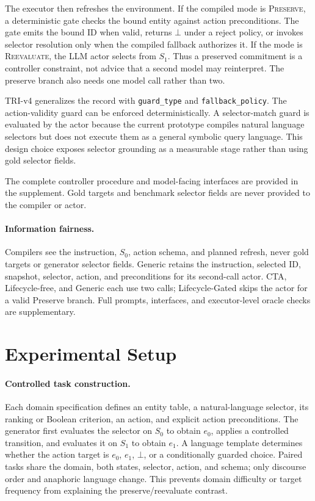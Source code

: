 \documentclass[letterpaper]{article}
\begin{document}
The executor then refreshes the environment. If the compiled mode is \textsc{Preserve}, a
deterministic gate checks the bound entity against action preconditions. The gate emits the
bound ID when valid, returns $\bot$ under a reject policy, or invokes selector resolution only
when the compiled fallback authorizes it. If the mode is \textsc{Reevaluate}, the LLM actor
selects from $S_1$. Thus a preserved commitment is a controller constraint, not advice that a
second model may reinterpret. The preserve branch also needs one model call rather than two.

TRI-v4 generalizes the record with \texttt{guard\_type} and
\texttt{fallback\_policy}. The action-validity guard can be enforced deterministically. A
selector-match guard is evaluated by the actor because the current prototype compiles natural
language selectors but does not execute them as a general symbolic query language. This design
choice exposes selector grounding as a measurable stage rather than using gold selector fields.

The complete controller procedure and model-facing interfaces are provided in the supplement.
Gold targets and benchmark selector fields are never provided to the compiler or actor.

\paragraph{Information fairness.}
Compilers see the instruction, $S_0$, action schema, and planned refresh, never gold targets or
generator selector fields. Generic retains the instruction, selected ID, snapshot, selector,
action, and preconditions for its second-call actor. CTA, Lifecycle-free, and Generic each use
two calls; Lifecycle-Gated skips the actor for a valid Preserve branch. Full prompts, interfaces,
and executor-level oracle checks are supplementary.

\section{Experimental Setup}

\paragraph{Controlled task construction.}
Each domain specification defines an entity table, a natural-language selector, its ranking or
Boolean criterion, an action, and explicit action preconditions. The generator first evaluates
the selector on $S_0$ to obtain $e_0$, applies a controlled transition, and evaluates it on
$S_1$ to obtain $e_1$. A language template determines whether the action target is $e_0$,
$e_1$, $\bot$, or a conditionally guarded choice. Paired tasks share the domain, both states,
selector, action, and schema; only discourse order and anaphoric language change. This prevents
domain difficulty or target frequency from explaining the preserve/reevaluate contrast.
\end{document}

